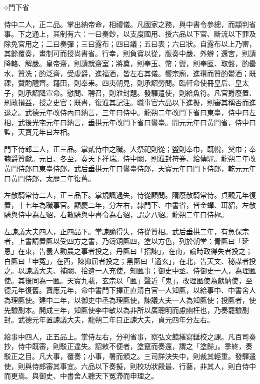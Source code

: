 
\begin{pinyinscope}

 ○門下省



 侍中二人，正二品。掌出納帝命，相禮儀。凡國家之務，與中書令參總，而顓判省事。下之通上，其制有六：一曰奏鈔，以支度國用、授六品以下官、斷流以下罪及除免官用之；二曰奏彈；三曰露布；四曰議；五曰表；六曰狀。自露布以上乃審，其餘覆奏，畫制可而授尚書省。行幸，則負寶以從，版奏中嚴、外辦；還宮，則請降輅、解嚴。皇帝齋，則請就齋室；將奠，則奉玉、幣；盥，則奉匜、取盤，酌罍水，贊洗；酌泛齊，受虛爵，進福酒，皆左右其儀。饗宗廟，進瓚而贊酌鬱酒；既祼，贊酌醴齊。籍田，則奉耒。四夷朝見，則承詔勞問。臨軒命使冊皇后、皇太子，則承詔降宣命。慰問、聘召，則涖封題。發驛遣使，則給魚符。凡官爵廢置、刑政損益，授之史官；既書，復涖其記注。職事官六品以下進擬，則審其稱否而進退之。武德元年改侍內曰納言，三年曰侍中。龍朔二年改門下省曰東臺，侍中曰左相，武後光宅元年曰納言，垂拱元年改門下省曰鸞臺。開元元年曰黃門省，侍中曰監，天寶元年曰左相。



 門下侍郎二人，正三品。掌貳侍中之職。大祭祀則從；盥則奉巾，既帨，奠巾；奉匏爵贊獻。元日、冬至，奏天下祥瑞。侍中闕，則涖封符券、給傳驛。龍朔二年改黃門侍郎曰東臺侍郎，武后垂拱元年曰鸞臺侍郎，天寶元年曰門下侍郎，乾元元年曰黃門侍郎，太歷二年復舊。



 左散騎常侍二人，正三品下。掌規諷過失，侍從顧問。隋廢散騎常侍。貞觀元年復置，十七年為職事官。顯慶二年，分左右，隸門下、中書省，皆金蟬、珥貂，左散騎與侍中為左貂，右散騎與中書令為右貂，謂之八貂。龍朔二年曰侍極。



 左諫議大夫四人，正四品下。掌諫諭得失，侍從贊相。武后垂拱二年，有魚保宗者，上書請置匭以受四方之書，乃鑄銅匭四，塗以方色，列於朝堂：青匭曰「延恩」在東，告養人勸農之事者投之，丹匭曰「招諫」，在南，論時政得失者投之；白匭曰「申冤」，在西，陳抑屈者投之；黑匭曰「通玄」，在北，告天文、秘謀者投之。以諫議大夫、補闕、拾遺一人充使，知匭事；御史中丞、侍御史一人，為理匭使。其後同為一匭。天寶九載，玄宗以「匭」聲近「鬼」，改理匭使為獻納使，至德元年復舊。寶應元年，命中書門下擇正直清白官一人知匭，以給事中、中書舍人為理匭使。建中二年，以御史中丞為理匭使，諫議大夫一人為知匭使；投匭者，使先驗副本。開成三年，知匭使李中敏以為非所以廣聰明而慮幽枉也，乃奏罷驗副封。武德元年置諫議大夫，龍朔二年曰正諫大夫，貞元四年分左右。



 給事中四人，正五品上。掌侍左右，分判省事，察弘文館繕寫讎校之課。凡百司奏抄，侍中既審，則駁正違失。詔敕不便者，塗竄而奏還，謂之「塗歸」。季終，奏駁正之目。凡大事，覆奏；小事，署而頒之。三司詳決失中，則裁其輕重。發驛遣使，則與侍郎審其事宜。六品以下奏擬，則校功狀殿最、行藝，非其人，則白侍中而更焉。與御史、中書舍人聽天下冤滯而申理之。




\end{pinyinscope}
